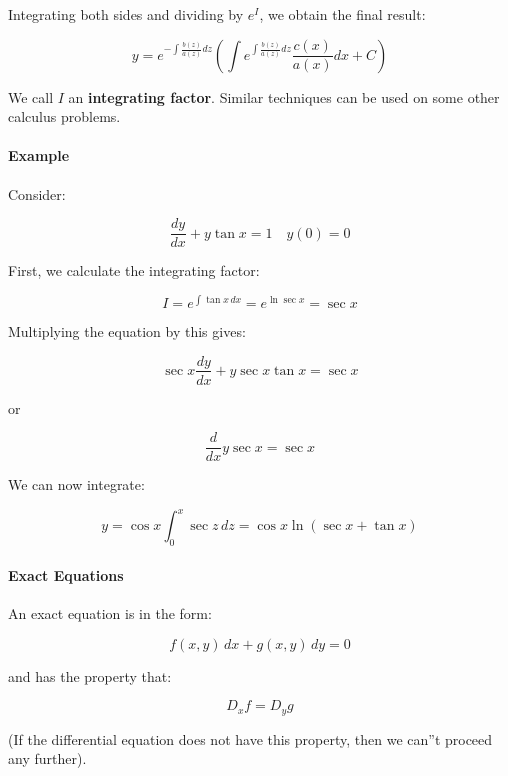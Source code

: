 Integrating both sides and dividing by $e^I$, we obtain the final result:



$$y = e^{-\int \frac{b(z)}{a(z)}dz}
\left(\int e^{\int \frac{b(z)}{a(z)}dz}\frac{c(x)}{a(x)}dx + C\right)$$



We call $I$ an \textbf{integrating factor}. Similar techniques can be used on some other calculus problems.



\paragraph{Example}

Consider:



$$\frac{dy}{dx} + y \tan x = 1 \quad y(0) = 0$$



First, we calculate the integrating factor:



$$I = e^{\int \tan x \,dx} = e^ {\ln \sec x} = \sec x$$



Multiplying the equation by this gives:



$$\sec x \frac{dy}{dx} + y \sec x \tan x = \sec x$$



or



$$\frac{d}{dx} y\sec x = \sec x$$



We can now integrate:



$$y = \cos x \int_0^x \sec z \, dz = \cos x \ln (\sec x + \tan x)$$



\paragraph{Exact Equations}

An exact equation is in the form:

$$f(x, y) \,dx + g(x, y) \,dy = 0$$

and has the property that:

$$D_x f = D_y g$$

(If the differential equation does not have this property, then we can''t proceed any further).




